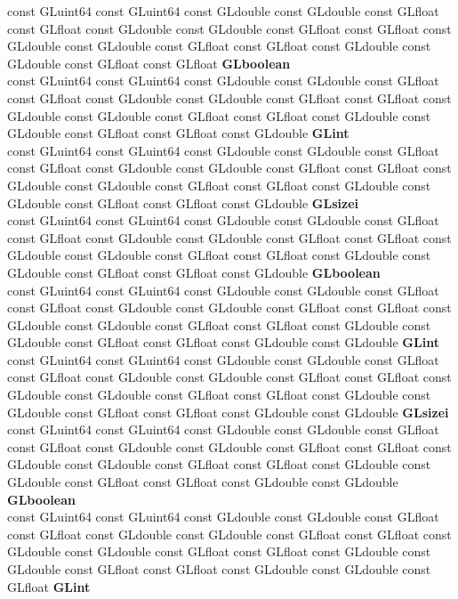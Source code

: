 \begin{DoxyCompactItemize}
\begin{tabbing}
\>const GLuint64 const GLuint64 const GLdouble const GLdouble const GLfloat const GLfloat const GLdouble const GLdouble const GLfloat const GLfloat const GLdouble const GLdouble const GLfloat const GLfloat const GLdouble const GLdouble const GLfloat const GLfloat {\bfseries GLboolean}\\
\>const GLuint64 const GLuint64 const GLdouble const GLdouble const GLfloat const GLfloat const GLdouble const GLdouble const GLfloat const GLfloat const GLdouble const GLdouble const GLfloat const GLfloat const GLdouble const GLdouble const GLfloat const GLfloat const GLdouble {\bfseries GLint}\\
\>const GLuint64 const GLuint64 const GLdouble const GLdouble const GLfloat const GLfloat const GLdouble const GLdouble const GLfloat const GLfloat const GLdouble const GLdouble const GLfloat const GLfloat const GLdouble const GLdouble const GLfloat const GLfloat const GLdouble {\bfseries GLsizei}\\
\>const GLuint64 const GLuint64 const GLdouble const GLdouble const GLfloat const GLfloat const GLdouble const GLdouble const GLfloat const GLfloat const GLdouble const GLdouble const GLfloat const GLfloat const GLdouble const GLdouble const GLfloat const GLfloat const GLdouble {\bfseries GLboolean}\\
\>const GLuint64 const GLuint64 const GLdouble const GLdouble const GLfloat const GLfloat const GLdouble const GLdouble const GLfloat const GLfloat const GLdouble const GLdouble const GLfloat const GLfloat const GLdouble const GLdouble const GLfloat const GLfloat const GLdouble const GLdouble {\bfseries GLint}\\
\>const GLuint64 const GLuint64 const GLdouble const GLdouble const GLfloat const GLfloat const GLdouble const GLdouble const GLfloat const GLfloat const GLdouble const GLdouble const GLfloat const GLfloat const GLdouble const GLdouble const GLfloat const GLfloat const GLdouble const GLdouble {\bfseries GLsizei}\\
\>const GLuint64 const GLuint64 const GLdouble const GLdouble const GLfloat const GLfloat const GLdouble const GLdouble const GLfloat const GLfloat const GLdouble const GLdouble const GLfloat const GLfloat const GLdouble const GLdouble const GLfloat const GLfloat const GLdouble const GLdouble {\bfseries GLboolean}\\
\>const GLuint64 const GLuint64 const GLdouble const GLdouble const GLfloat const GLfloat const GLdouble const GLdouble const GLfloat const GLfloat const GLdouble const GLdouble const GLfloat const GLfloat const GLdouble const GLdouble const GLfloat const GLfloat const GLdouble const GLdouble const GLfloat {\bfseries GLint}\\

\end{tabbing}
\end{DoxyCompactItemize}

